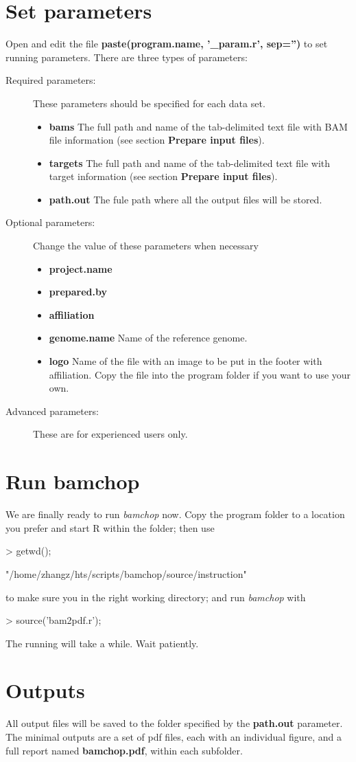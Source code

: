\documentclass{article}
\begin{document}
\section{Set parameters}
Open and edit the file \textbf{paste(program.name, '_param.r', sep='')} to set running parameters. There are three types of parameters:
\begin{description}
\item[Required parameters:] These parameters should be specified for each data set.
\begin{itemize}
  \item \textbf{bams} The full path and name of the tab-delimited text file with BAM file information (see section \textbf{Prepare input files}).
  \item \textbf{targets} The full path and name of the tab-delimited text file with target information (see section \textbf{Prepare input files}).
  \item \textbf{path.out} The fule path where all the output files will be stored.
  \end{itemize}
\item[Optional parameters:] Change the value of these parameters when necessary
\begin{itemize}
  \item \textbf{project.name}
  \item \textbf{prepared.by} 
  \item \textbf{affiliation} 
  \item \textbf{genome.name} Name of the reference genome.
  \item \textbf{logo} Name of the file with an image to be put in the footer with affiliation. Copy the file into the program folder if you want to use your own.
  \end{itemize}
  \item[Advanced parameters:] These are for experienced users only.  
\end{description}

\section{Run bamchop}
We are finally ready to run \textit{bamchop} now. Copy the program folder to a location you prefer and start R within the folder; then use
\begin{Schunk}
\begin{Sinput}
> getwd();
\end{Sinput}
\begin{Soutput}
[1] "/home/zhangz/hts/scripts/bamchop/source/instruction"
\end{Soutput}
\end{Schunk}
to make sure you in the right working directory; and run \textit{bamchop} with
\begin{Schunk}
\begin{Sinput}
> source('bam2pdf.r');
\end{Sinput}
\end{Schunk}
The running will take a while. Wait patiently. 

\section{Outputs}
All output files will be saved to the folder specified by the \textbf{path.out} parameter. The minimal outputs are a set of pdf files, each with an individual figure, and a full report named \textbf{bamchop.pdf}, within each subfolder. 
\end{document}
